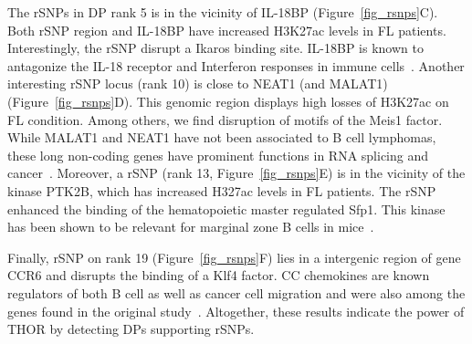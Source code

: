 \noindent
The rSNPs in DP rank 5 is in the vicinity of IL-18BP (Figure~\ref{fig_rsnps}C). 
Both rSNP region and IL-18BP have increased H3K27ac levels in FL patients. 
Interestingly, the rSNP disrupt a Ikaros binding site. 
IL-18BP is known to antagonize the IL-18 receptor and Interferon responses in immune cells~\citep{Yoshimoto1998}. 
Another interesting rSNP locus (rank 10) is close to NEAT1 (and MALAT1) (Figure~\ref{fig_rsnps}D). 
This genomic region displays high losses of H3K27ac on FL condition. 
Among others, we find disruption of motifs of the Meis1 factor. 
While MALAT1 and NEAT1 have not been associated to B cell lymphomas, these long non-coding genes have prominent functions in RNA splicing and cancer~\citep{Gutschner2013}.
Moreover, a rSNP (rank 13, Figure~\ref{fig_rsnps}E) is in the vicinity of the kinase PTK2B, which has increased H327ac levels in FL patients. 
The rSNP enhanced the binding of the hematopoietic master regulated Sfp1. 
This kinase has been shown to be relevant for marginal zone B cells in mice~\citep{Guinamard2000}.

Finally, rSNP on rank 19 (Figure~\ref{fig_rsnps}F) lies in a intergenic region of gene CCR6 and disrupts the binding of a Klf4 factor. 
CC chemokines are known regulators of both B cell as well as cancer cell migration and were also among the genes found in the original study~\citep{Koues2015}.  
Altogether, these results indicate the power of THOR by detecting DPs supporting rSNPs. 

